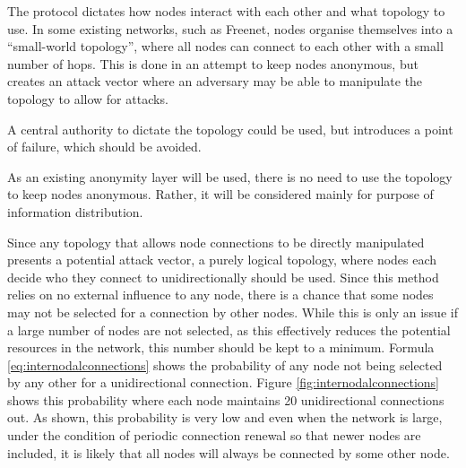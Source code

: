 			
			
			
			The protocol dictates how nodes interact with each other and what topology to use. In some existing networks, such as Freenet, nodes organise themselves into a ``small-world topology'', where all nodes can connect to each other with a small number of hops. This is done in an attempt to keep nodes anonymous, but creates an attack vector where an adversary may be able to manipulate the topology to allow for attacks.
			
			A central authority to dictate the topology could be used, but introduces a point of failure, which should be avoided.
			
			As an existing anonymity layer will be used, there is no need to use the topology to keep nodes anonymous. Rather, it will be considered mainly for purpose of information distribution. 
			
			Since any topology that allows node connections to be directly manipulated presents a potential attack vector, a purely logical topology, where nodes each decide who they connect to unidirectionally should be used. Since this method relies on no external influence to any node, there is a chance that some nodes may not be selected for a connection by other nodes. While this is only an issue if a large number of nodes are not selected, as this effectively reduces the potential resources in the network, this number should be kept to a minimum. Formula \ref{eq:internodalconnections} shows the probability of any node not being selected by any other for a unidirectional connection. Figure \ref{fig:internodalconnections} shows this probability where each node maintains 20 unidirectional connections out. As shown, this probability is very low and even when the network is large, under the condition of periodic connection renewal so that newer nodes are included, it is likely that all nodes will always be connected by some other node.
			

